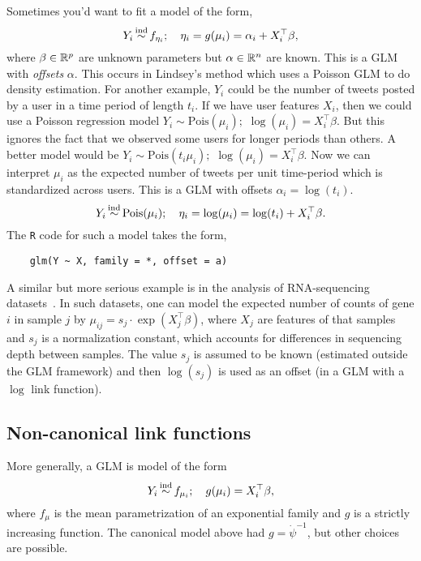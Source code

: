 Sometimes you'd want to fit a model of the form,
\[ 
    Y_i \simind f_{\eta_i}; \quad \eta_i = g(\mu_i) = \alpha_i + X_i^\top\beta,    
\]
where $\beta \in \mathbb{R}^p$ are unknown parameters but $\alpha \in \mathbb{R}^n$ are known. This is a GLM with \emph{offsets} $\alpha$. This occurs in Lindsey's method which uses a Poisson GLM to do density estimation. For another example, $Y_i$ could be the number of tweets posted by a user in a time period of length $t_i$. If we have user features $X_i$, then we could use a Poisson regression model $Y_i \sim \mathrm{Pois}(\mu_i);$ $\log(\mu_i) = X_i^\top \beta$. But this ignores the fact that we observed some users for longer periods than others. A better model would be $Y_i \sim \mathrm{Pois}(t_i\mu_i);$ $\log(\mu_i) = X_i^\top \beta$. Now we can interpret $\mu_i$ as the expected number of tweets per unit time-period which is standardized across users. This is a GLM with offsets $\alpha_i = \log(t_i)$. 
\[Y_i \simind \mathrm{Pois}(\mu_i); \quad \eta_i = \log(\mu_i) = \log(t_i) + X_i^\top\beta. \]
The \verb|R| code for such a model takes the form,
\begin{verbatim}
    glm(Y ~ X, family = *, offset = a)
\end{verbatim}
A similar but more serious example is in the analysis of RNA-sequencing datasets~\citet{love2014moderated}. In such datasets, one can model the expected number of counts of gene $i$ in sample $j$ by $\mu_{ij} = s_j \cdot \exp(X_j^\top \beta)$, where $X_{j}$ are features of that samples and $s_j$ is a normalization constant, which accounts for differences in sequencing depth between samples. The value $s_j$ is assumed to be known (estimated outside the GLM framework) and then $\log(s_j)$ is used as an offset (in a GLM with a $\log$ link function).



\subsection{Non-canonical link functions}

More generally, a GLM is model of the form
\[Y_i \simind f_{\mu_i}; \quad g(\mu_i) = X_i^\top \beta,\]
where $f_{\mu}$ is the mean parametrization of an exponential family and $g$ is a strictly increasing function. The canonical model above had $g = \dot{\psi}^{-1}$, but other choices are possible.

